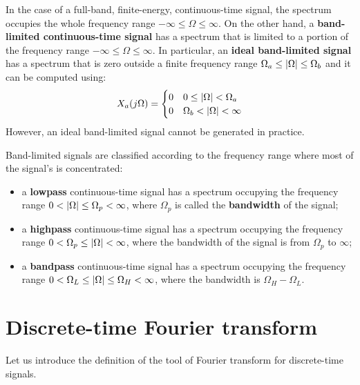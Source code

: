 \documentclass[../../main/main.tex]{subfiles}
\begin{document}
\medskip
{}
In the case of a full-band, finite-energy, continuous-time signal, the spectrum occupies the whole frequency range \( -\infty \le \Omega \le \infty \).
On the other hand, a \textbf{band-limited continuous-time signal} has a spectrum that is limited to a portion of the frequency range \( -\infty \le \Omega \le \infty \).
In particular, an \textbf{ideal band-limited signal} has a spectrum that is zero outside a finite frequency range \( \Omega_{a} \le \abs{\Omega} \le \Omega_{b} \) and it can be computed using:
\begin{equation}
    X_{a}(j\Omega)
    =
    \begin{cases}
        0   &   0 \le \abs{\Omega} < \Omega_{a} \\
        0   &   \Omega_{b} < \abs{\Omega} < \infty
    \end{cases}
    \label{eq:L08_S14_1}
\end{equation}
However, an ideal band-limited signal cannot be generated in practice.

Band-limited signals are classified according to the frequency range where most of the signal's is concentrated:
\begin{itemize}
    \item a \textbf{lowpass} continuous-time signal has a spectrum occupying the frequency range \( 0 < \abs{\Omega} \le \Omega_{p} < \infty \), where \( \Omega_{p} \) is called the \textbf{bandwidth} of the signal;
    \item a \textbf{highpass} continuous-time signal has a spectrum occupying the frequency range \( 0 < \Omega_{p} \le \abs{\Omega} < \infty \), where the bandwidth of the signal is from \( \Omega_{p} \) to \( \infty \);
    \item a \textbf{bandpass} continuous-time signal has a spectrum occupying the frequency range \( 0 < \Omega_{L} \le \abs{\Omega} \le \Omega_{H} < \infty \), where the bandwidth is \( \Omega_{H} - \Omega_{L} \).
\end{itemize}





\section{Discrete-time Fourier transform}
Let us introduce the definition of the tool of Fourier transform for discrete-time signals.
\end{document}
